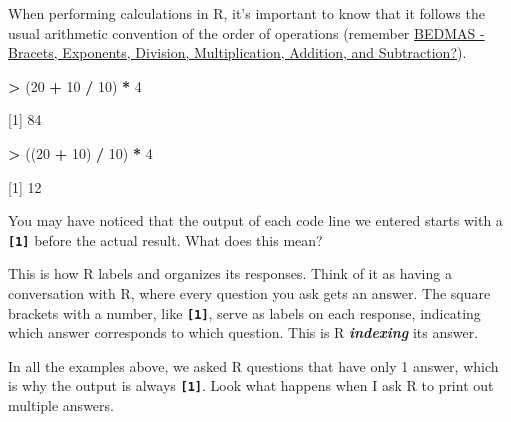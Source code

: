 \documentclass[
]{book}
\newenvironment{Shaded}{\begin{snugshade}}{\end{snugshade}}
\newcommand{\CommentTok}[1]{\textcolor[rgb]{0.56,0.35,0.01}{\textit{#1}}}
\newcommand{\DecValTok}[1]{\textcolor[rgb]{0.00,0.00,0.81}{#1}}
\newcommand{\FunctionTok}[1]{\textcolor[rgb]{0.13,0.29,0.53}{\textbf{#1}}}
\newcommand{\NormalTok}[1]{#1}
\newcommand{\SpecialCharTok}[1]{\textcolor[rgb]{0.81,0.36,0.00}{\textbf{#1}}}
\begin{document}
When performing calculations in R, it's important to know that it follows the usual arithmetic convention of the order of operations (remember \href{https://www.tes.com/en-ie/teaching-resource/bidmas-bodmas-bedmas-bimdas-pemdas-permdas-11154272\#:~:text=\%E2\%80\%A2\%20BIMDAS\%20\%2D\%20Brackets\%2C\%20Indices\%2C,Multiplication\%2C\%20Division\%2C\%20Addition\%2C\%20Subtraction}{BEDMAS - Bracets, Exponents, Division, Multiplication, Addition, and Subtraction?}).

\begin{Shaded}
\begin{Highlighting}[]
\SpecialCharTok{\textgreater{}}\NormalTok{ (}\DecValTok{20} \SpecialCharTok{+} \DecValTok{10} \SpecialCharTok{/} \DecValTok{10}\NormalTok{) }\SpecialCharTok{*} \DecValTok{4} 

\NormalTok{[}\DecValTok{1}\NormalTok{] }\DecValTok{84}

\SpecialCharTok{\textgreater{}}\NormalTok{ ((}\DecValTok{20} \SpecialCharTok{+} \DecValTok{10}\NormalTok{) }\SpecialCharTok{/} \DecValTok{10}\NormalTok{) }\SpecialCharTok{*} \DecValTok{4}

\NormalTok{[}\DecValTok{1}\NormalTok{] }\DecValTok{12}
\end{Highlighting}
\end{Shaded}

You may have noticed that the output of each code line we entered starts with a \textbf{\texttt{{[}1{]}}} before the actual result. What does this mean?

This is how R labels and organizes its responses. Think of it as having a conversation with R, where every question you ask gets an answer. The square brackets with a number, like \textbf{\texttt{{[}1{]}}}, serve as labels on each response, indicating which answer corresponds to which question. This is R \textbf{\emph{indexing}} its answer.

In all the examples above, we asked R questions that have only 1 answer, which is why the output is always \textbf{\texttt{{[}1{]}}}. Look what happens when I ask R to print out multiple answers.

\begin{Shaded}
\end{Shaded}
\end{document}
